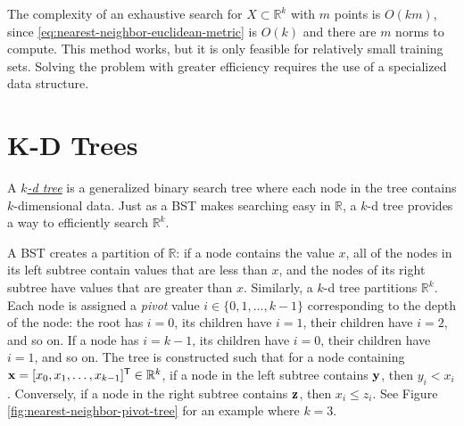 The complexity of an exhaustive search for $X\subset\mathbb{R}^k$ with $m$ points is $O(km)$, since \eqref{eq:nearest-neighbor-euclidean-metric} is $O(k)$ and there are $m$ norms to compute.
This method works, but it is only feasible for relatively small training sets.
Solving the problem with greater efficiency requires the use of a specialized data structure.

\section*{K-D Trees} %

A \href{https://en.wikipedia.org/wiki/K-d_tree}{\emph{$k$-d tree}} is a generalized binary search tree where each node in the tree contains $k$-dimensional data.
Just as a BST makes searching easy in $\mathbb{R}$, a $k$-d tree provides a way to efficiently search $\mathbb{R}^k$.

A BST creates a partition of $\mathbb{R}$: if a node contains the value $x$, all of the nodes in its left subtree contain values that are less than $x$, and the nodes of its right subtree have values that are greater than $x$.
Similarly, a $k$-d tree partitions $\mathbb{R}^k$.
Each node is assigned a \emph{pivot} value $i \in \{0,1,\ldots,k-1\}$ corresponding to the depth of the node: the root has $i=0$, its children have $i=1$, their children have $i=2$, and so on.
If a node has $i=k-1$, its children have $i=0$, their children have $i=1$, and so on.
The tree is constructed such that for a node containing $\mathbf{x} = [x_0,x_1,\ldots,x_{k-1}]^{\mathsf T} \in\mathbb{R}^k$, if a node in the left subtree contains $\mathbf{y}$, then $y_i < x_i$.
Conversely, if a node in the right subtree contains $\mathbf{z}$, then $x_i \le z_i$.
See Figure \ref{fig:nearest-neighbor-pivot-tree} for an example where $k = 3$.


